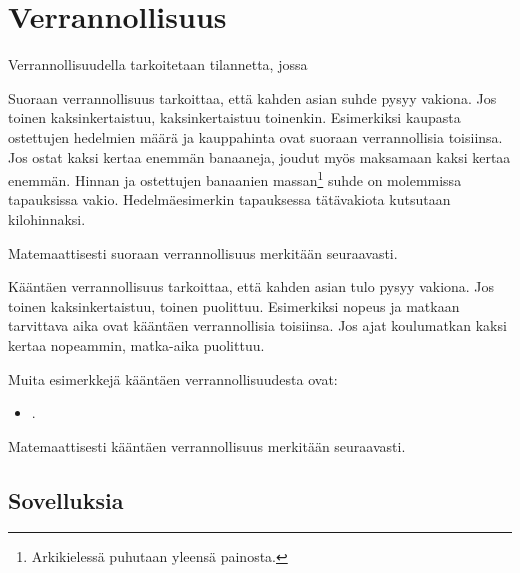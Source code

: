 \chapter{Verrannollisuus}

Verrannollisuudella tarkoitetaan tilannetta, jossa 

Suoraan verrannollisuus tarkoittaa, että kahden asian suhde pysyy vakiona. Jos toinen kaksinkertaistuu, kaksinkertaistuu toinenkin. Esimerkiksi kaupasta ostettujen hedelmien määrä ja kauppahinta ovat suoraan verrannollisia toisiinsa. Jos ostat kaksi kertaa enemmän banaaneja, joudut myös maksamaan kaksi kertaa enemmän. Hinnan ja ostettujen banaanien massan\footnote{Arkikielessä puhutaan yleensä painosta.} suhde on molemmissa tapauksissa vakio. Hedelmäesimerkin tapauksessa tätävakiota kutsutaan kilohinnaksi.

Matemaattisesti suoraan verrannollisuus merkitään seuraavasti.



Kääntäen verrannollisuus tarkoittaa, että kahden asian tulo pysyy vakiona. Jos toinen kaksinkertaistuu, toinen puolittuu. Esimerkiksi nopeus ja matkaan tarvittava aika ovat kääntäen verrannollisia toisiinsa. Jos ajat koulumatkan kaksi kertaa nopeammin, matka-aika puolittuu.

Muita esimerkkejä kääntäen verrannollisuudesta ovat:
\begin{itemize}
    \item .
\end{itemize}

Matemaattisesti kääntäen verrannollisuus merkitään seuraavasti.


\section{Sovelluksia}

